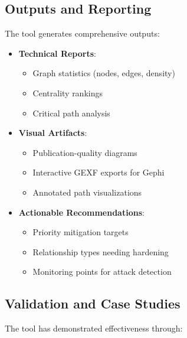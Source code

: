 \documentclass[binding=0.6cm]{sapthesis}
\begin{document}
\subsection{Outputs and Reporting}

The tool generates comprehensive outputs:

\begin{itemize}
\item \textbf{Technical Reports}:
\begin{itemize}
\item Graph statistics (nodes, edges, density)
\item Centrality rankings
\item Critical path analysis
\end{itemize}

\item \textbf{Visual Artifacts}:
\begin{itemize}
    \item Publication-quality diagrams
    \item Interactive GEXF exports for Gephi
    \item Annotated path visualizations
\end{itemize}

\item \textbf{Actionable Recommendations}:
\begin{itemize}
    \item Priority mitigation targets
    \item Relationship types needing hardening
    \item Monitoring points for attack detection
\end{itemize}
\end{itemize}

\subsection{Validation and Case Studies}

The tool has demonstrated effectiveness through:
\end{document}
